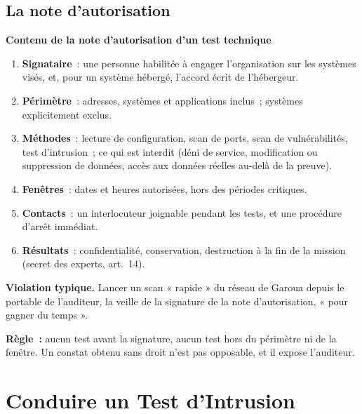 \subsection{La note d'autorisation}

\begin{boxprocedure}
\textbf{Contenu de la note d'autorisation d'un test technique}
\begin{enumerate}
    \item \textbf{Signataire}~: une personne habilitée à engager
          l'organisation sur les systèmes visés, et, pour un système
          hébergé, l'accord écrit de l'hébergeur.
    \item \textbf{Périmètre}~: adresses, systèmes et applications inclus~;
          systèmes explicitement exclus.
    \item \textbf{Méthodes}~: lecture de configuration, scan de ports, scan
          de vulnérabilités, test d'intrusion~; ce qui est interdit (déni
          de service, modification ou suppression de données, accès aux
          données réelles au-delà de la preuve).
    \item \textbf{Fenêtres}~: dates et heures autorisées, hors des périodes
          critiques.
    \item \textbf{Contacts}~: un interlocuteur joignable pendant les tests,
          et une procédure d'arrêt immédiat.
    \item \textbf{Résultats}~: confidentialité, conservation, destruction
          à la fin de la mission (secret des experts, art.~14).
\end{enumerate}
\end{boxprocedure}

\begin{boxalert}
\textbf{Violation typique.} Lancer un scan « rapide » du réseau de Garoua
depuis le portable de l'auditeur, la veille de la signature de la note
d'autorisation, « pour gagner du temps ».

\smallskip
\textbf{Règle~:} aucun test avant la signature, aucun test hors du
périmètre ni de la fenêtre. Un constat obtenu sans droit n'est pas
opposable, et il expose l'auditeur.
\end{boxalert}

\section{Conduire un Test d'Intrusion}
\label{sec:c22-conduire}

